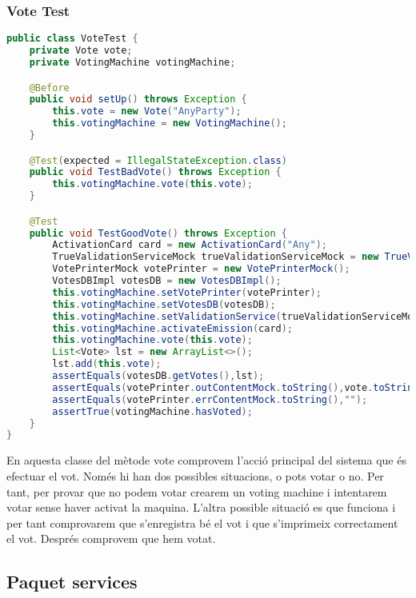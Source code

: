 \documentclass[11pt]{article}
\begin{document}
	\subsubsection{Vote Test}
	\begin{lstlisting}[basicstyle=\ttfamily\scriptsize,language=Java]
public class VoteTest {
    private Vote vote;
    private VotingMachine votingMachine;

    @Before
    public void setUp() throws Exception {
        this.vote = new Vote("AnyParty");
        this.votingMachine = new VotingMachine();
    }

    @Test(expected = IllegalStateException.class)
    public void TestBadVote() throws Exception {
        this.votingMachine.vote(this.vote);
    }

    @Test
    public void TestGoodVote() throws Exception {
        ActivationCard card = new ActivationCard("Any");
        TrueValidationServiceMock trueValidationServiceMock = new TrueValidationServiceMock();
        VotePrinterMock votePrinter = new VotePrinterMock();
        VotesDBImpl votesDB = new VotesDBImpl();
        this.votingMachine.setVotePrinter(votePrinter);
        this.votingMachine.setVotesDB(votesDB);
        this.votingMachine.setValidationService(trueValidationServiceMock);
        this.votingMachine.activateEmission(card);
        this.votingMachine.vote(this.vote);
        List<Vote> lst = new ArrayList<>();
        lst.add(this.vote);
        assertEquals(votesDB.getVotes(),lst);
        assertEquals(votePrinter.outContentMock.toString(),vote.toString());
        assertEquals(votePrinter.errContentMock.toString(),"");
        assertTrue(votingMachine.hasVoted);
    }
}
	\end{lstlisting}
	En aquesta classe del mètode vote comprovem l'acció principal del sistema que és efectuar el vot. Només hi han dos possibles situacions, o pots votar o no. Per tant, per provar que no podem votar crearem un voting machine i intentarem votar sense haver activat la maquina. L'altra possible situació es que funciona i per tant comprovarem que s'enregistra bé el vot i que s'imprimeix correctament el vot. Després comprovem que hem votat.
	\newpage
	\subsection{Paquet services}
\end{document}
